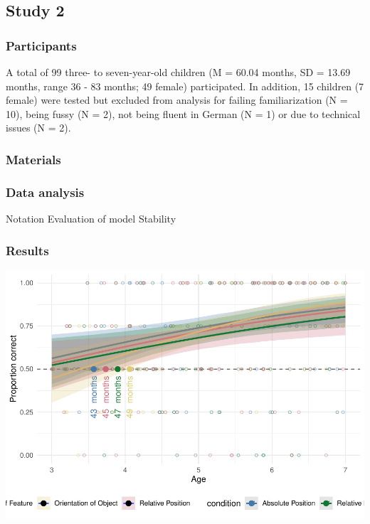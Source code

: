 \documentclass[
  man]{apa6}
\begin{document}
\subsection{Study 2}\label{study-2}

\subsubsection{Participants}\label{participants-1}

A total of 99 three- to seven-year-old children (M = 60.04 months, SD = 13.69 months, range 36 - 83 months; 49 female) participated. In addition, 15 children (7 female) were tested but excluded from analysis for failing familiarization (N = 10), being fussy (N = 2), not being fluent in German (N = 1) or due to technical issues (N = 2).

\subsubsection{Materials}\label{materials}

\subsubsection{Data analysis}\label{data-analysis}

Notation
Evaluation of model Stability

\subsubsection{Results}\label{results-1}

\includegraphics{symlit_rep_manuscript_files/figure-latex/S2_bayes_plot-1.pdf}
\end{document}
